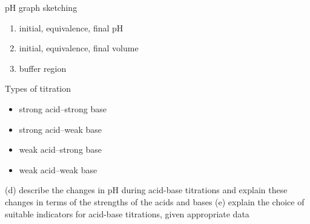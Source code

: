 pH graph sketching
\begin{enumerate}
\item initial, equivalence, final pH
\item initial, equivalence, final volume
\item buffer region
\end{enumerate}

Types of titration
\begin{itemize}
\item strong acid--strong base

\item strong acid--weak base

\item weak acid--strong base

\item weak acid--weak base
\end{itemize}

(d) describe the changes in pH during acid-base titrations and explain these changes in terms of the strengths of the acids and bases
(e) explain the choice of suitable indicators for acid-base titrations, given appropriate data

